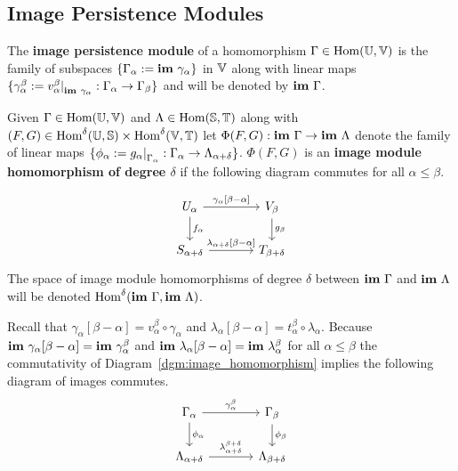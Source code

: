 \subsection{Image Persistence Modules}

\begin{definition}
  The \textbf{image persistence module} of a homomorphism $\Gamma\in\mathrm{Hom}(\mathbb{U},\mathbb{V})$ is the family of subspaces $\{\Gamma_\alpha :=\mathbf{im}~\gamma_\alpha\}$ in $\mathbb{V}$ along with linear maps $\{\gamma_\alpha^\beta := v_\alpha^\beta\mathord{\mid}_{\mathbf{im}~\gamma_\alpha} : \Gamma_\alpha\to\Gamma_\beta\}$ and will be denoted by $\mathbf{im}~\Gamma$.
\end{definition}

\begin{definition}
  Given $\Gamma\in\mathrm{Hom}(\mathbb{U},\mathbb{V})$ and $\Lambda\in\mathrm{Hom}(\mathbb{S},\mathbb{T})$ along with $(F,G)\in\mathrm{Hom}^\delta(\mathbb{U},\mathbb{S})\times\mathrm{Hom}^\delta(\mathbb{V},\mathbb{T})$ let $\Phi(F, G) : \mathbf{im}~\Gamma\to\mathbf{im}~\Lambda$ denote the family of linear maps $\{\phi_\alpha := g_\alpha\mathord{\mid}_{\Gamma_\alpha} : \Gamma_\alpha\to\Lambda_{\alpha+\delta}\}$.
  $\Phi(F, G)$ is an \textbf{image module homomorphism of degree $\delta$} if the following diagram commutes for all $\alpha\leq\beta$.

  \begin{equation}\label{dgm:image_homomorphism}
    \begin{tikzcd}[column sep=large]
        U_\alpha\arrow{r}{\gamma_\alpha[\beta-\alpha]}\arrow{d}{f_\alpha} &
      V_\beta\arrow{d}{g_\beta}\\
      S_{\alpha+\delta}\arrow{r}{\lambda_{\alpha+\delta}[\beta-\alpha]} &
      T_{\beta +\delta}
  \end{tikzcd}\end{equation}
  The space of image module homomorphisms of degree $\delta$ between $\mathbf{im}~\Gamma$ and $\mathbf{im}~\Lambda$ will be denoted $\mathrm{Hom}^\delta(\mathbf{im}~\Gamma,\mathbf{im}~\Lambda)$.
\end{definition}

Recall that $\gamma_\alpha[\beta-\alpha] = v_\alpha^\beta\circ\gamma_\alpha$ and $\lambda_\alpha[\beta-\alpha] = t_\alpha^\beta\circ\lambda_\alpha$.
Because $\mathbf{im}~\gamma_\alpha[\beta-\alpha] = \mathbf{im}~\gamma_\alpha^\beta$ and $\mathbf{im}~\lambda_{\alpha}[\beta-\alpha] = \mathbf{im}~\lambda_\alpha^\beta$ for all $\alpha\leq\beta$ the commutativity of Diagram~\ref{dgm:image_homomorphism} implies the following diagram of images commutes.
\begin{equation}\label{dgm:shifted_homomorphism}
  \begin{tikzcd}[column sep=large]
    \Gamma_\alpha\arrow{r}{\gamma_\alpha^\beta}\arrow{d}{\phi_\alpha} &
    \Gamma_\beta\arrow{d}{\phi_\beta}\\
    \Lambda_{\alpha+\delta}\arrow{r}{\lambda_{\alpha+\delta}^{\beta+\delta}} &
    \Lambda_{\beta +\delta}
\end{tikzcd}\end{equation}

